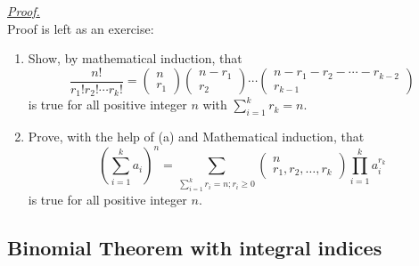 \documentclass[12pt]{article}
\renewenvironment{proof}[1][Proof]{\begin{snugshade*} \underline{\textit{{#1}.}}\\}{\hfill \qedsymbol \end{snugshade*}}
\begin{document}
    \begin{proof}
        Proof is left as an exercise:\begin{enumerate}
            \item Show, by mathematical induction, that \[\frac{n!}{r_1!r_2!\cdots r_k!}=\begin{pmatrix}
                n\\r_1
            \end{pmatrix}\begin{pmatrix}
                n-r_1\\r_2
            \end{pmatrix}\cdots\begin{pmatrix}
                n-r_1-r_2-\cdots-r_{k-2}\\r_{k-1}
            \end{pmatrix}\] is true for all positive integer $n$ with $\sum_{i=1}^{k}r_k=n$.
            \item Prove, with the help of (a) and Mathematical induction, that \[(\sum_{i=1}^{k}a_i)^n=\sum_{\sum_{i=1}^{k}r_i=n; r_i\geq 0}\begin{pmatrix}
                n\\r_1,r_2,\dots,r_k
            \end{pmatrix}\prod_{i=1}^k a_i^{r_k}\] is true for all positive integer $n$.
        \end{enumerate}
    \end{proof}

    \subsection{Binomial Theorem with integral indices}
\end{document}
